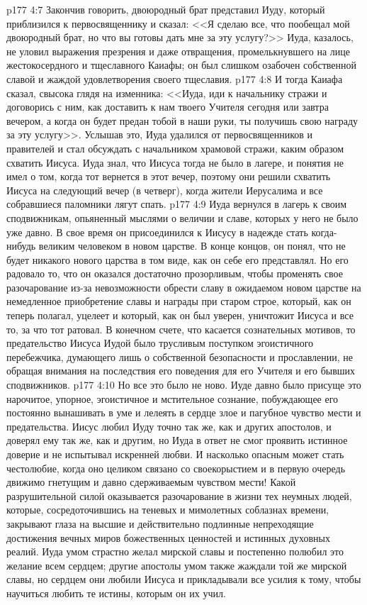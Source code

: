 \vs p177 4:7 Закончив говорить, двоюродный брат представил Иуду, который приблизился к первосвященнику и сказал: <<Я сделаю все, что пообещал мой двоюродный брат, но что вы готовы дать мне за эту услугу?>> Иуда, казалось, не уловил выражения презрения и даже отвращения, промелькнувшего на лице жестокосердного и тщеславного Каиафы; он был слишком озабочен собственной славой и жаждой удовлетворения своего тщеславия.
\vs p177 4:8 И тогда Каиафа сказал, свысока глядя на изменника: <<Иуда, иди к начальнику стражи и договорись с ним, как доставить к нам твоего Учителя сегодня или завтра вечером, а когда он будет предан тобой в наши руки, ты получишь свою награду за эту услугу>>. Услышав это, Иуда удалился от первосвященников и правителей и стал обсуждать с начальником храмовой стражи, каким образом схватить Иисуса. Иуда знал, что Иисуса тогда не было в лагере, и понятия не имел о том, когда тот вернется в этот вечер, поэтому они решили схватить Иисуса на следующий вечер (в четверг), когда жители Иерусалима и все собравшиеся паломники лягут спать.
\vs p177 4:9 Иуда вернулся в лагерь к своим сподвижникам, опьяненный мыслями о величии и славе, которых у него не было уже давно. В свое время он присоединился к Иисусу в надежде стать когда\hyp{}нибудь великим человеком в новом царстве. В конце концов, он понял, что не будет никакого нового царства в том виде, как он себе его представлял. Но его радовало то, что он оказался достаточно прозорливым, чтобы променять свое разочарование из\hyp{}за невозможности обрести славу в ожидаемом новом царстве на немедленное приобретение славы и награды при старом строе, который, как он теперь полагал, уцелеет и который, как он был уверен, уничтожит Иисуса и все то, за что тот ратовал. В конечном счете, что касается сознательных мотивов, то предательство Иисуса Иудой было трусливым поступком эгоистичного перебежчика, думающего лишь о собственной безопасности и прославлении, не обращая внимания на последствия его поведения для его Учителя и его бывших сподвижников.
\vs p177 4:10 Но все это было не ново. Иуде давно было присуще это нарочитое, упорное, эгоистичное и мстительное сознание, побуждающее его постоянно вынашивать в уме и лелеять в сердце злое и пагубное чувство мести и предательства. Иисус любил Иуду точно так же, как и других апостолов, и доверял ему так же, как и другим, но Иуда в ответ не смог проявить истинное доверие и не испытывал искренней любви. И насколько опасным может стать честолюбие, когда оно целиком связано со своекорыстием и в первую очередь движимо гнетущим и давно сдерживаемым чувством мести! Какой разрушительной силой оказывается разочарование в жизни тех неумных людей, которые, сосредоточившись на теневых и мимолетных соблазнах времени, закрывают глаза на высшие и действительно подлинные непреходящие достижения вечных миров божественных ценностей и истинных духовных реалий. Иуда умом страстно желал мирской славы и постепенно полюбил это желание всем сердцем; другие апостолы умом также жаждали той же мирской славы, но сердцем они любили Иисуса и прикладывали все усилия к тому, чтобы научиться любить те истины, которым он их учил.
